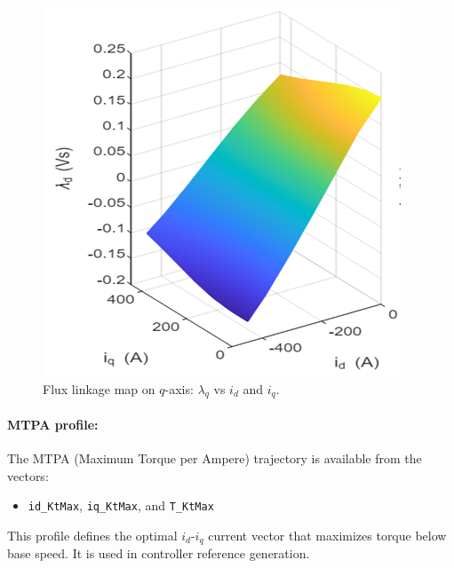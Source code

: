 \begin{figure}[!ht]
    \centering
    \includegraphics[width=0.8\linewidth]{Figures/Flux map on q axis.png}
    \caption{Flux linkage map on $q$-axis: $\lambda_q$ vs $i_d$ and $i_q$.}
    \label{fig:flux_q}
\end{figure}

\paragraph{MTPA profile:}

The MTPA (Maximum Torque per Ampere) trajectory is available from the vectors:
\begin{itemize}
    \item \texttt{id\_KtMax}, \texttt{iq\_KtMax}, and \texttt{T\_KtMax}
\end{itemize}

This profile defines the optimal $i_d$-$i_q$ current vector that maximizes torque below base speed. It is used in controller reference generation.

